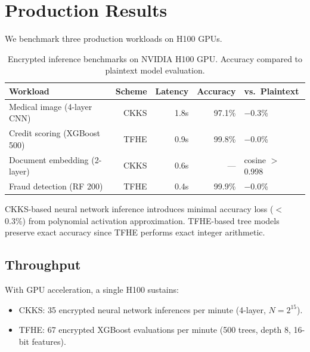 \section{Production Results}

\label{sec:results}

We benchmark three production workloads on H100 GPUs.

\begin{table}[H]
\centering
\small
\begin{tabular}{lrrrl}
\toprule
\textbf{Workload} & \textbf{Scheme} & \textbf{Latency} & \textbf{Accuracy} & \textbf{vs.\ Plaintext} \\
\midrule
Medical image (4-layer CNN) & CKKS & 1.8s & 97.1\% & $-$0.3\% \\
Credit scoring (XGBoost 500) & TFHE & 0.9s & 99.8\% & $-$0.0\% \\
Document embedding (2-layer) & CKKS & 0.6s & --- & cosine $>$ 0.998 \\
Fraud detection (RF 200) & TFHE & 0.4s & 99.9\% & $-$0.0\% \\
\bottomrule
\end{tabular}
\caption{Encrypted inference benchmarks on NVIDIA H100 GPU. Accuracy compared
to plaintext model evaluation.}
\label{tab:benchmarks}
\end{table}

CKKS-based neural network inference introduces minimal accuracy loss ($<$0.3\%)
from polynomial activation approximation. TFHE-based tree models preserve exact
accuracy since TFHE performs exact integer arithmetic.

\subsection{Throughput}

With GPU acceleration, a single H100 sustains:
\begin{itemize}[leftmargin=1.1em]
    \item CKKS: 35 encrypted neural network inferences per minute (4-layer,
    $N = 2^{15}$).
    \item TFHE: 67 encrypted XGBoost evaluations per minute (500 trees,
    depth 8, 16-bit features).
\end{itemize}

